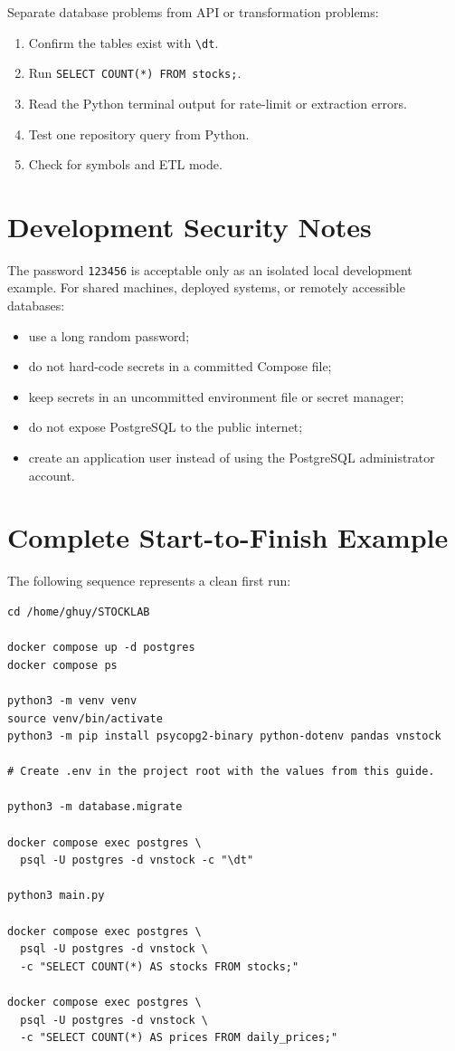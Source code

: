 \documentclass[11pt,a4paper]{article}
\newcommand{\filename}[1]{\texttt{\detokenize{#1}}}
\begin{document}
Separate database problems from API or transformation problems:

\begin{enumerate}[leftmargin=2em]
    \item Confirm the tables exist with \texttt{\textbackslash dt}.
    \item Run \texttt{SELECT COUNT(*) FROM stocks;}.
    \item Read the Python terminal output for rate-limit or extraction errors.
    \item Test one repository query from Python.
    \item Check \filename{stock_config.py} for symbols and ETL mode.
\end{enumerate}

\section{Development Security Notes}

The password \texttt{123456} is acceptable only as an isolated local
development example. For shared machines, deployed systems, or remotely
accessible databases:

\begin{itemize}[leftmargin=2em]
    \item use a long random password;
    \item do not hard-code secrets in a committed Compose file;
    \item keep secrets in an uncommitted environment file or secret manager;
    \item do not expose PostgreSQL to the public internet;
    \item create an application user instead of using the PostgreSQL
          administrator account.
\end{itemize}

\section{Complete Start-to-Finish Example}

The following sequence represents a clean first run:

\begin{lstlisting}[style=terminal]
cd /home/ghuy/STOCKLAB

docker compose up -d postgres
docker compose ps

python3 -m venv venv
source venv/bin/activate
python3 -m pip install psycopg2-binary python-dotenv pandas vnstock

# Create .env in the project root with the values from this guide.

python3 -m database.migrate

docker compose exec postgres \
  psql -U postgres -d vnstock -c "\dt"

python3 main.py

docker compose exec postgres \
  psql -U postgres -d vnstock \
  -c "SELECT COUNT(*) AS stocks FROM stocks;"

docker compose exec postgres \
  psql -U postgres -d vnstock \
  -c "SELECT COUNT(*) AS prices FROM daily_prices;"
\end{lstlisting}
\end{document}
